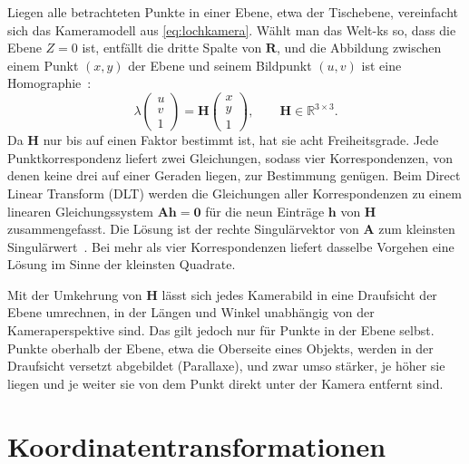Liegen alle betrachteten Punkte in einer Ebene, etwa der Tischebene, vereinfacht sich das
Kameramodell aus \cref{eq:lochkamera}. Wählt man das Welt-\ac{ks} so, dass die Ebene
$Z = 0$ ist, entfällt die dritte Spalte von $\mathbf{R}$, und die Abbildung zwischen einem
Punkt $(x, y)$ der Ebene und seinem Bildpunkt $(u, v)$ ist eine Homographie~\cite{hartley2004}:
\begin{equation}
  \lambda \begin{pmatrix} u \\ v \\ 1 \end{pmatrix}
  = \mathbf{H} \begin{pmatrix} x \\ y \\ 1 \end{pmatrix},
  \qquad \mathbf{H} \in \mathbb{R}^{3 \times 3} .
\end{equation}
Da $\mathbf{H}$ nur bis auf einen Faktor bestimmt ist, hat sie acht Freiheitsgrade. Jede
Punktkorrespondenz liefert zwei Gleichungen, sodass vier Korrespondenzen, von denen keine drei
auf einer Geraden liegen, zur Bestimmung genügen. Beim Direct Linear Transform (DLT) werden
die Gleichungen aller Korrespondenzen zu einem linearen Gleichungssystem
$\mathbf{A}\mathbf{h} = \mathbf{0}$ für die neun Einträge $\mathbf{h}$ von $\mathbf{H}$
zusammengefasst. Die Lösung ist der rechte Singulärvektor von $\mathbf{A}$ zum kleinsten
Singulärwert~\cite{hartley2004}. Bei mehr als vier Korrespondenzen liefert dasselbe Vorgehen
eine Lösung im Sinne der kleinsten Quadrate.

Mit der Umkehrung von $\mathbf{H}$ lässt sich jedes Kamerabild in eine Draufsicht der Ebene
umrechnen, in der Längen und Winkel unabhängig von der Kameraperspektive sind. Das gilt jedoch
nur für Punkte in der Ebene selbst. Punkte oberhalb der Ebene, etwa die Oberseite eines
Objekts, werden in der Draufsicht versetzt abgebildet (Parallaxe), und zwar umso stärker, je
höher sie liegen und je weiter sie von dem Punkt direkt unter der Kamera entfernt sind.

\section{Koordinatentransformationen}
\label{sec:transformationen}

